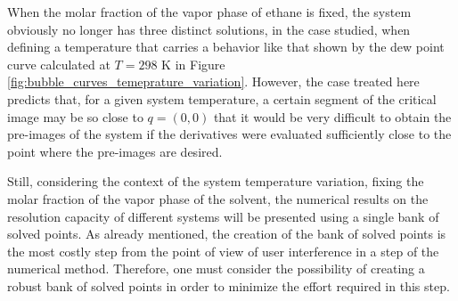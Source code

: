 \documentclass[journal=iecred,manuscript=article]{achemso}
\theoremstyle{definition}
\theoremstyle{remark}
\begin{document}
When the molar fraction of the vapor phase of ethane is fixed, the system obviously no longer has three distinct solutions, in the case studied, when defining a temperature that carries a behavior like that shown by the dew point curve calculated at $ T = 298 $ K in Figure \ref{fig:bubble_curves_temeprature_variation}. However, the case treated here predicts that, for a given system temperature, a certain segment of the critical image may be so close to $ q = \left(0, 0\right) $ that it would be very difficult to obtain the pre-images of the system if the derivatives were evaluated sufficiently close to the point where the pre-images are desired.

Still, considering the context of the system temperature variation, fixing the molar fraction of the vapor phase of the solvent, the numerical results on the resolution capacity of different systems will be presented using a single bank of solved points. As already mentioned, the creation of the bank of solved points is the most costly step from the point of view of user interference in a step of the numerical method. Therefore, one must consider the possibility of creating a robust bank of solved points in order to minimize the effort required in this step.
\end{document}
